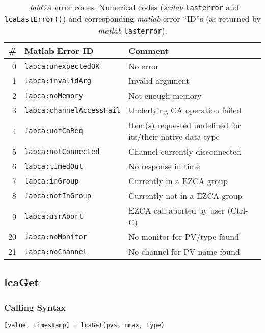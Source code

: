 \documentclass{article}
\newcommand{\sca}{\ita{labCA}}
\newcommand{\scilab}{\ita{scilab}}
\newcommand{\matlab}{\ita{matlab}}
\newcommand{\com}[1]{{\tt #1}}
\newcommand{\pbrk}{\pagebreak[3]}
\newcommand{\ita}[1]{\emph{#1}}
\renewcommand{\pbrk}{}
\begin{document}
\begin{table}[h]
\begin{tabular}{r|l|p{5.5cm}}
	\#                   &      Matlab Error ID         & Comment \\
	\hline
	0                    & \com{labca:unexpectedOK}     & No error \\
    1                    & \com{labca:invalidArg}       & Invalid argument \\
    2                    & \com{labca:noMemory}         & Not enough memory \\
    3                    & \com{labca:channelAccessFail}& Underlying CA operation failed \\
    4                    & \com{labca:udfCaReq}         & Item(s) requested undefined for its/their native data type\\
    5                    & \com{labca:notConnected}     & Channel currently disconnected\\
    6                    & \com{labca:timedOut}         & No response in time \\
    7                    & \com{labca:inGroup}          & Currently in a EZCA group\\
    8                    & \com{labca:notInGroup}       & Currently not in a EZCA group\\
    9                    & \com{labca:usrAbort}         & EZCA call aborted by user (Ctrl-C) \\
    20                   & \com{labca:noMonitor}        & No monitor for PV/type found\\
    21                   & \com{labca:noChannel}        & No channel for PV name found\\
\end{tabular}
\caption{~\sca{} error codes. Numerical codes (\scilab{} \com{lasterror} and
\com{lcaLastError()}) and corresponding \matlab{} error ``ID''s
(as returned by \matlab{} \com{lasterror}).}
\label{tbl:errors}
\end{table}


\vspace*{\fill}
\pbrk
\subsection{lcaGet}
\label{lcaget}
\subsubsection{Calling Syntax}
\begin{verbatim}
[value, timestamp] = lcaGet(pvs, nmax, type)
\end{verbatim}
\end{document}
